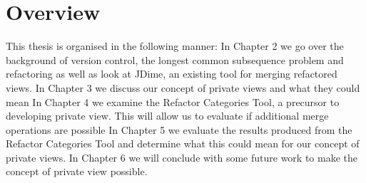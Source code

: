 % 
 

\section{Overview}
This thesis is organised in the following manner:
In Chapter 2 we go over the background of version control, the longest common subsequence problem and refactoring as well as look at JDime, an existing tool for merging refactored views.
In Chapter 3 we discuss our concept of private views and what they could mean
In Chapter 4 we examine the Refactor Categories Tool, a precursor to developing private view. This will allow us to evaluate if additional merge operations are possible
In Chapter 5 we evaluate the results produced from the Refactor Categories Tool and determine what this could mean for our concept of private views.
In Chapter 6 we will conclude with some future work to make the concept of private view possible. 

